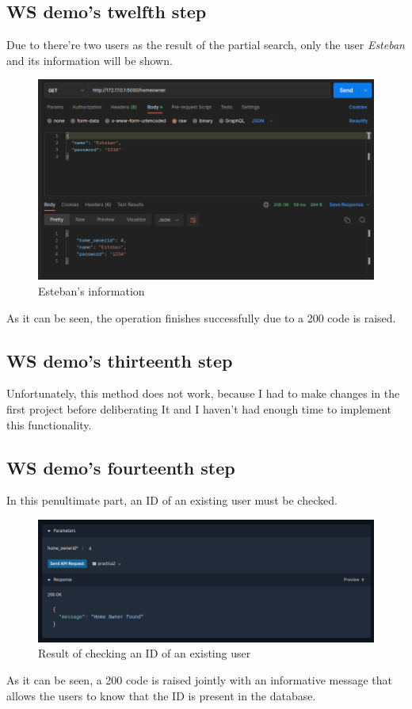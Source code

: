 \documentclass[a4paper,12pt]{article}
\begin{document}
\subsection*{WS demo's twelfth step}
Due to there're two users as the result of the partial search, only the user \textit{Esteban} and its information will be shown.
\begin{figure}[H]
    \centering
    \includegraphics[scale = 0.5]{images/Esteban GET.png}
    \caption{Esteban's information}
    \label{fig:estebanG}
\end{figure}
As it can be seen, the operation finishes successfully due to a 200 code is raised.
\subsection*{WS demo's thirteenth step}
Unfortunately, this method does not work, because I had to make changes in the first project before deliberating It and I haven't had enough time to implement this functionality.
\subsection*{WS demo's fourteenth step}
In this penultimate part, an ID of an existing user must be checked.
\begin{figure}[H]
    \centering
    \includegraphics[scale = 0.5]{images/check id existent.png}
    \caption{Result of checking an ID of an existing user}
    \label{fig:idExist}
\end{figure}
As it can be seen, a 200 code is raised jointly with an informative message that allows the users to know that the ID is present in the database.
\end{document}
